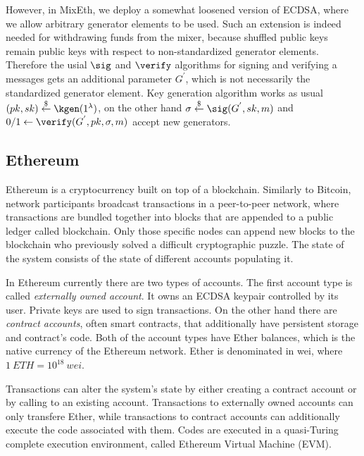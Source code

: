 \documentclass[a4paper]{article}
\theoremstyle{definition}
\begin{document}
However, in MixEth, we deploy a somewhat loosened version of ECDSA, where we allow arbitrary generator elements to be used. Such an extension is indeed needed for withdrawing funds from the mixer, because shuffled public keys remain public keys with respect to non-standardized generator elements. Therefore the usial $\sig$ and $\verify$ algorithms for signing and verifying a messages gets an additional parameter $G^{'}$, which is not necessarily the standardized generator element. Key generation algorithm works as usual $(pk,sk)\stackrel{\$}{\leftarrow}\kgen(1^{\lambda})$, on the other hand $\sigma\stackrel{\$}{\leftarrow}\sig(G^{'},sk,m)$ and  $0/1\leftarrow \verify(G^{'},pk,\sigma, m)$ accept new generators.

\subsection{Ethereum}

Ethereum is a cryptocurrency built on top of a blockchain. Similarly to Bitcoin, network participants broadcast transactions in a peer-to-peer network, where transactions are bundled together into blocks that are appended to a public ledger called blockchain. Only those specific nodes can append new blocks to the blockchain who previously solved a difficult cryptographic puzzle. The state of the system consists of the state of different accounts populating it. 

In Ethereum currently there are two types of accounts. The first account type is called \textit{externally owned account}. It owns an ECDSA keypair controlled by its user. Private keys are used to sign transactions. On the other hand there are \textit{contract accounts}, often smart contracts, that additionally have persistent storage and contract's code. Both of the account types have Ether balances, which is the native currency of the Ethereum network. Ether is denominated in wei, where $1\ ETH = 10^ {18}\ wei$.

Transactions can alter the system's state by either creating a contract account or by calling to an existing account. Transactions to externally owned accounts can only transfere Ether, while transactions to contract accounts can additionally execute the code associated with them. Codes are executed in a quasi-Turing complete execution environment, called Ethereum Virtual Machine (EVM).
\end{document}
